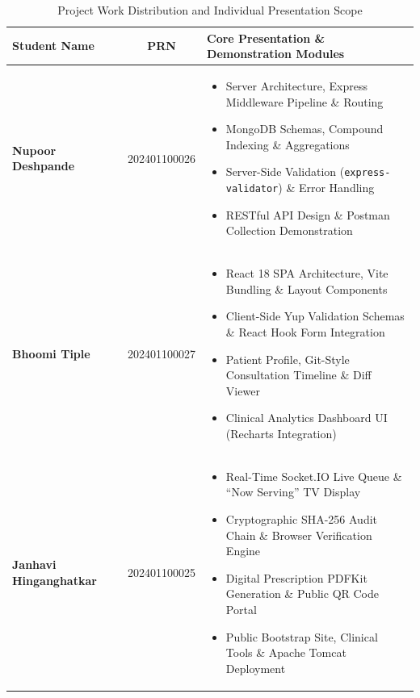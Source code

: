 \documentclass[12pt,a4paper,oneside]{report}
\begin{document}
\begin{table}[h!]
\centering
\caption{Project Work Distribution and Individual Presentation Scope}
\label{tab:group_roles}
\begin{tabularx}{\textwidth}{l c X}
\toprule
\textbf{Student Name} & \textbf{PRN} & \textbf{Core Presentation \& Demonstration Modules} \\
\midrule
\textbf{Nupoor Deshpande} & 202401100026 & 
\begin{itemize}[noitemsep,leftmargin=*]
    \item Server Architecture, Express Middleware Pipeline \& Routing
    \item MongoDB Schemas, Compound Indexing \& Aggregations
    \item Server-Side Validation (\texttt{express-validator}) \& Error Handling
    \item RESTful API Design \& Postman Collection Demonstration
\end{itemize} \\
\midrule
\textbf{Bhoomi Tiple} & 202401100027 & 
\begin{itemize}[noitemsep,leftmargin=*]
    \item React 18 SPA Architecture, Vite Bundling \& Layout Components
    \item Client-Side Yup Validation Schemas \& React Hook Form Integration
    \item Patient Profile, Git-Style Consultation Timeline \& Diff Viewer
    \item Clinical Analytics Dashboard UI (Recharts Integration)
\end{itemize} \\
\midrule
\textbf{Janhavi Hinganghatkar} & 202401100025 & 
\begin{itemize}[noitemsep,leftmargin=*]
    \item Real-Time Socket.IO Live Queue \& ``Now Serving'' TV Display
    \item Cryptographic SHA-256 Audit Chain \& Browser Verification Engine
    \item Digital Prescription PDFKit Generation \& Public QR Code Portal
    \item Public Bootstrap Site, Clinical Tools \& Apache Tomcat Deployment
\end{itemize} \\
\bottomrule
\end{tabularx}
\end{table}

\end{document}
